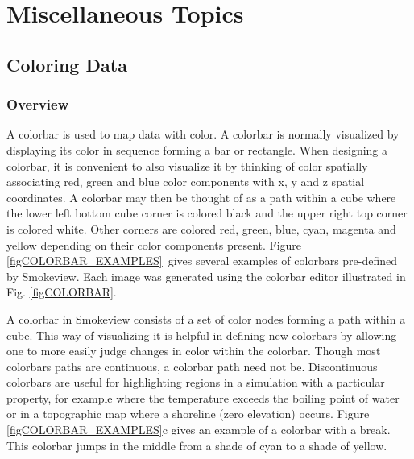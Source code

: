 \documentclass[11pt,twoside]{book}
\begin{document}
\part{Miscellaneous Topics}


\chapter{Coloring Data}
\label{chap:colorbar}
\section{Overview}
A colorbar is used to map
data with color.  A colorbar is normally visualized by
displaying its color in sequence forming a bar or rectangle.
When designing a colorbar, it is convenient to also visualize it
by thinking of color spatially associating red, green and
blue color components with x, y and z spatial coordinates.  A colorbar
may then be thought of as a path within a cube where the lower left bottom
cube corner is colored black and the upper right top corner is colored
white.  Other corners are colored red, green, blue, cyan, magenta and
yellow depending on their color components present.
Figure \ref{figCOLORBAR_EXAMPLES}\ gives several examples of colorbars pre-defined
by Smokeview.  Each image was generated using the colorbar editor
illustrated in Fig. \ref{figCOLORBAR}.

A colorbar in Smokeview consists of a set of color nodes forming a path
within a cube.  This way of visualizing it is helpful in defining new
colorbars by allowing one to more easily judge changes in color within the
colorbar.  Though most colorbars paths are continuous, a colorbar
path need not be.  Discontinuous colorbars
are useful for highlighting regions in a simulation with a particular
property, for example where the temperature exceeds the boiling point of
water or in a topographic map where a shoreline (zero elevation) occurs.
Figure \ref{figCOLORBAR_EXAMPLES}c
gives an example of a colorbar with a break.  This colorbar jumps in the
middle from a shade of cyan to a shade of yellow.

\end{document}
